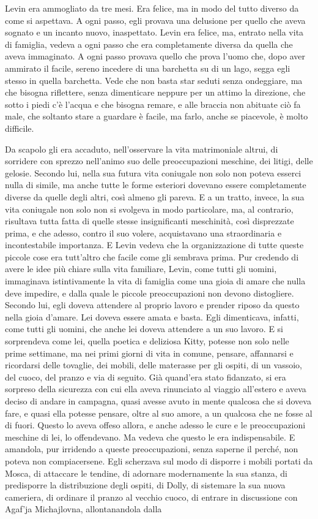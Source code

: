Levin era ammogliato da tre mesi. Era felice, ma in modo del tutto diverso da come si aspettava. A ogni passo, egli provava una delusione per quello che aveva sognato e un incanto nuovo, inaspettato. Levin era felice, ma, entrato nella vita di famiglia, vedeva a ogni passo che era completamente diversa da quella che aveva immaginato. A ogni passo provava quello che prova l'uomo che, dopo aver ammirato il facile, sereno incedere di una barchetta su di un lago, segga egli stesso in quella barchetta. Vede che non basta star seduti senza ondeggiare, ma che bisogna riflettere, senza dimenticare neppure per un attimo la direzione, che sotto i piedi c'è l'acqua e che bisogna remare, e alle braccia non abituate ciò fa male, che soltanto stare a guardare è facile, ma farlo, anche se piacevole, è molto difficile. 

Da scapolo gli era accaduto, nell'osservare la vita matrimoniale altrui, di sorridere con sprezzo nell'animo suo delle preoccupazioni meschine, dei litigi, delle gelosie. Secondo lui, nella sua futura vita coniugale non solo non poteva esserci nulla di simile, ma anche tutte le forme esteriori dovevano essere completamente diverse da quelle degli altri, così almeno gli pareva. E a un tratto, invece, la sua vita coniugale non solo non si svolgeva in modo particolare, ma, al contrario, risultava tutta fatta di quelle stesse insignificanti meschinità, così disprezzate prima, e che adesso, contro il suo volere, acquistavano una straordinaria e incontestabile importanza. E Levin vedeva che la organizzazione di tutte queste piccole cose era tutt'altro che facile come gli sembrava prima. Pur credendo di avere le idee più chiare sulla vita familiare, Levin, come tutti gli uomini, immaginava istintivamente la vita di famiglia come una gioia di amare che nulla deve impedire, e dalla quale le piccole preoccupazioni non devono distogliere. Secondo lui, egli doveva attendere al proprio lavoro e prender riposo da questo nella gioia d'amare. Lei doveva essere amata e basta. Egli dimenticava, infatti, come tutti gli uomini, che anche lei doveva attendere a un suo lavoro. E si sorprendeva come lei, quella poetica e deliziosa Kitty, potesse non solo nelle prime settimane, ma nei primi giorni di vita in comune, pensare, affannarsi e ricordarsi delle tovaglie, dei mobili, delle materasse per gli ospiti, di un vassoio, del cuoco, del pranzo e via di seguito. Già quand'era stato fidanzato, si era sorpreso della sicurezza con cui ella aveva rinunciato al viaggio all'estero e aveva deciso di andare in campagna, quasi avesse avuto in mente qualcosa che si doveva fare, e quasi ella potesse pensare, oltre al suo amore, a un qualcosa che ne fosse al di fuori. Questo lo aveva offeso allora, e anche adesso le cure e le preoccupazioni meschine di lei, lo offendevano. Ma vedeva che questo le era indispensabile. E amandola, pur irridendo a queste preoccupazioni, senza saperne il perché, non poteva non compiacersene. Egli scherzava sul modo di disporre i mobili portati da Mosca, di attaccare le tendine, di adornare modernamente la sua stanza, di predisporre la distribuzione degli ospiti, di Dolly, di sistemare la sua nuova cameriera, di ordinare il pranzo al vecchio cuoco, di entrare in discussione con Agaf'ja Michajlovna, allontanandola dalla 